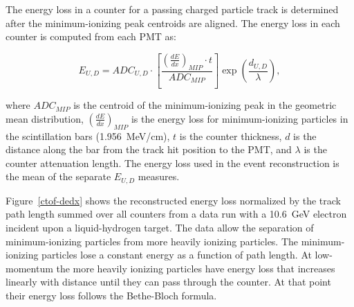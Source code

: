 \documentclass[3p,times,twocolumn]{elsarticle}
\begin{document}
The energy loss in a counter for a passing charged particle track is determined after the
minimum-ionizing peak centroids are aligned. The energy loss in each counter is computed from each
PMT as:

\begin{equation}
E_{U,D} = ADC_{U,D} \cdot \left [ \frac{\left( \frac{dE}{dx} \right)_{MIP} \cdot t}{ADC_{MIP}}\right ]
\exp\left(\frac{d_{U,D}}{\lambda}\right),
\end{equation}

\noindent
where $ADC_{MIP}$ is the centroid of the minimum-ionizing peak in the geometric mean distribution,
$\left( \frac{dE}{dx} \right)_{MIP}$ is the energy loss for minimum-ionizing particles in the scintillation
bars (1.956~MeV/cm), $t$ is the counter thickness, $d$ is the distance along the bar from the track hit
position to the PMT, and $\lambda$ is the counter attenuation length. The energy loss used in the event
reconstruction is the mean of the separate $E_{U,D}$ measures.

Figure~\ref{ctof-dedx} shows the reconstructed energy loss normalized by the track path length summed
over all counters from a data run with a 10.6~GeV electron incident upon a liquid-hydrogen target. The data
allow the separation of minimum-ionizing particles from more heavily ionizing particles. The minimum-ionizing
particles lose a constant energy as a function of path length. At low-momentum the more heavily ionizing
particles have energy loss that increases linearly with distance until they can pass through the counter. At
that point their energy loss follows the Bethe-Bloch formula.
\end{document}
